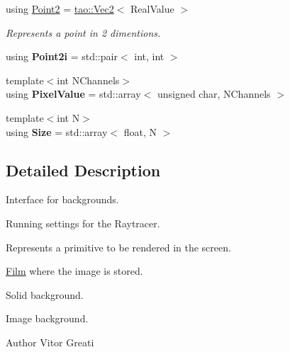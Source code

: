 \begin{DoxyCompactItemize}
\mbox{\label{namespaceomg_a18e42fb7bbc4159e9137145b866ec578}} 
using \mbox{\hyperlink{namespaceomg_a18e42fb7bbc4159e9137145b866ec578}{Point2}} = \mbox{\hyperlink{namespacetao_a7c689316b82c94e7228f42ac874a548b}{tao\+::\+Vec2}}$<$ Real\+Value $>$
\begin{DoxyCompactList}\small\item\em Represents a point in 2 dimentions. \end{DoxyCompactList}\item 
\mbox{\label{namespaceomg_a3de4fc5981be4c324c9cf84a4f845f8b}} 
using {\bfseries Point2i} = std\+::pair$<$ int, int $>$
\item 
\mbox{\label{namespaceomg_adfd06c82d92702d5d6411fb77c25af04}} 
{\footnotesize template$<$int N\+Channels$>$ }\\using {\bfseries Pixel\+Value} = std\+::array$<$ unsigned char, N\+Channels $>$
\item 
\mbox{\label{namespaceomg_a3f437d3821402dd1b1d1ddb5c73f6597}} 
{\footnotesize template$<$int N$>$ }\\using {\bfseries Size} = std\+::array$<$ float, N $>$
\end{DoxyCompactItemize}


\subsection{Detailed Description}
Interface for backgrounds. 

Running settings for the Raytracer.

Represents a primitive to be rendered in the screen.

\mbox{\hyperlink{classomg_1_1_film}{Film}} where the image is stored.

Solid background.

Image background.

\begin{DoxyAuthor}{Author}
Vitor Greati 
\end{DoxyAuthor}
